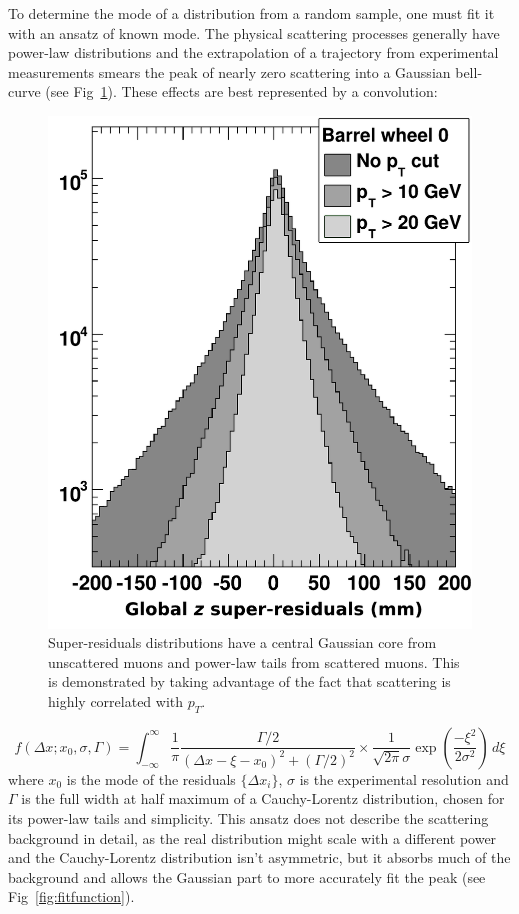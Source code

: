 \documentclass[12pt]{article}
\begin{document}
To determine the mode of a distribution from a random sample, one must
fit it with an ansatz of known mode.  The physical scattering
processes generally have power-law distributions and the extrapolation
of a trajectory from experimental measurements smears the peak of
nearly zero scattering into a Gaussian bell-curve (see
Fig~\ref{fig:residuals_barrel}).  These effects are best represented
by a convolution:
\begin{figure}
\begin{center} \includegraphics[width=0.4\linewidth]{residuals_barrel.pdf} \end{center}
\caption{Super-residuals distributions have a central Gaussian core from unscattered muons and power-law tails from scattered muons. This is demonstrated by taking advantage of the fact that scattering is highly correlated with $p_T$. \label{fig:residuals_barrel}}
\end{figure}
\begin{equation}
f(\Delta x; x_0, \sigma, \Gamma) = \int_{-\infty}^\infty
\frac{1}{\pi}\frac{\Gamma/2}{(\Delta x - \xi - x_0)^2 + (\Gamma/2)^2} \times 
\frac{1}{\sqrt{2\pi} \sigma} \exp\left(\frac{-\xi^2}{2 \sigma^2}\right) \, d\xi
\label{eqn:fitfunction}
\end{equation}
where $x_0$ is the mode of the residuals $\{\Delta x_i\}$, $\sigma$ is
the experimental resolution and $\Gamma$ is the full width at half
maximum of a Cauchy-Lorentz distribution, chosen for its power-law
tails and simplicity.  This ansatz does not describe the scattering
background in detail, as the real distribution might scale with a
different power and the Cauchy-Lorentz distribution isn't asymmetric,
but it absorbs much of the background and allows the Gaussian part to
more accurately fit the peak (see Fig~\ref{fig:fitfunction}).
\end{document}
